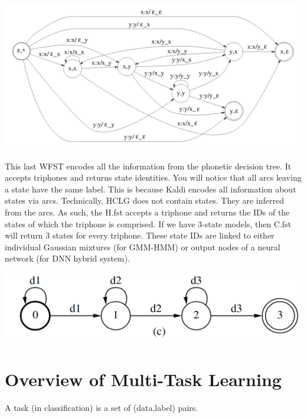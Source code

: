 \documentclass[10pt,a4paper]{article}
\begin{document}
\begin{center}
  \includegraphics[width=.9\textwidth,keepaspectratio]{figs/mohri-C.png}
\end{center}

This last WFST encodes all the information from the phonetic decision tree. It accepts triphones and returns state identities. You will notice that all arcs leaving a state have the same label. This is because Kaldi encodes all information about states via arcs. Technically, HCLG does not contain states. They are inferred from the arcs. As such, the H.fst accepts a triphone and returns the IDs of the states of which the triphone is comprised. If we have 3-state models, then C.fst will return 3 states for every triphone. These state IDs are linked to either individual Gaussian mixtures (for GMM-HMM) or output nodes of a neural network (for DNN hybrid system).


\begin{center}
  \includegraphics[width=.9\textwidth,keepaspectratio]{figs/mohri-H.png}
\end{center}











\newpage

\section{Overview of Multi-Task Learning}

A task (in classification) is a set of (data,label) pairs.
\end{document}
